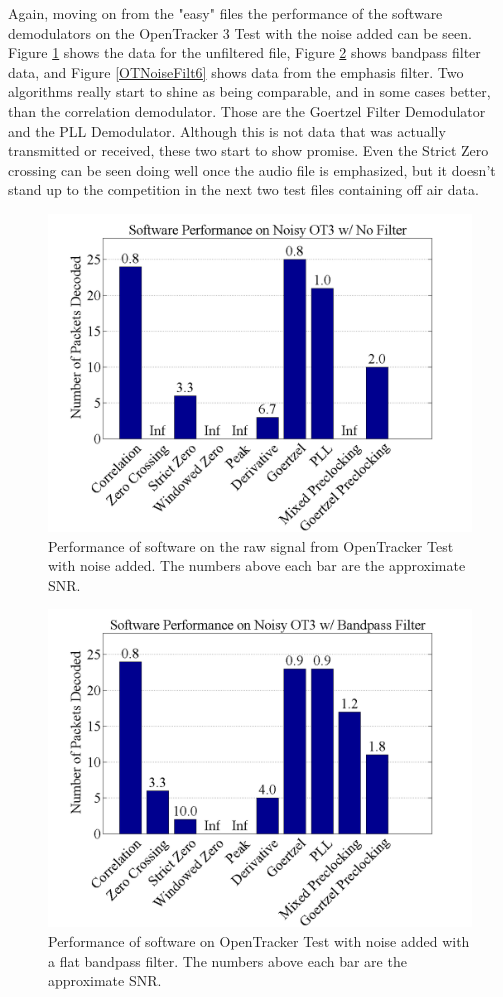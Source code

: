 Again, moving on from the "easy" files the performance of the software demodulators on the OpenTracker 3 Test with the noise added can be seen. Figure \ref{OTNoiseFiltNo} shows the data for the unfiltered file, Figure \ref{OTNoiseFilt0} shows bandpass filter data, and Figure \ref{OTNoiseFilt6} shows data from the emphasis filter. Two algorithms really start to shine as being comparable, and in some cases better, than the correlation demodulator. Those are the Goertzel Filter Demodulator and the PLL Demodulator. Although this is not data that was actually transmitted or received, these two start to show promise. Even the Strict Zero crossing can be seen doing well once the audio file is emphasized, but it doesn't stand up to the competition in the next two test files containing off air data.

\begin{figure}
  \centering
	\includegraphics[width=0.75\linewidth]{images/SoftwarePerformanceonNoisyOT3wNoFilter.png} 
	\caption[Performance of software on the raw signal from OpenTracker Test with noise added.]{Performance of software on the raw signal from OpenTracker Test with noise added. The numbers above each bar are the approximate SNR.}
   \label{OTNoiseFiltNo}
\end{figure}
\begin{figure}
  \centering
	\includegraphics[width=0.75\linewidth]{images/SoftwarePerformanceonNoisyOT3wBandpassFilter.png} 
	\caption[Performance of software on OpenTracker Test with noise added with a flat bandpass filter.]{Performance of software on OpenTracker Test with noise added with a flat bandpass filter. The numbers above each bar are the approximate SNR.}
   \label{OTNoiseFilt0}
\end{figure}

